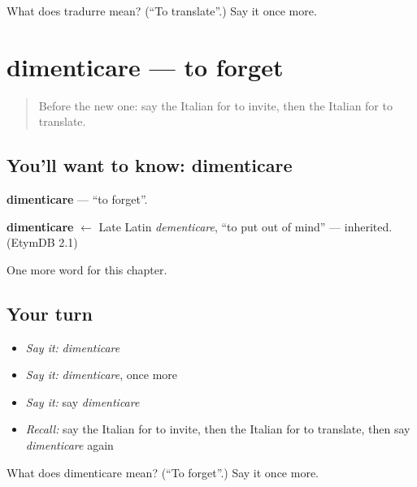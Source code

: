 \begin{tcolorbox}[breakable,colback=teal!4,colframe=teal!35!black,title={Before you move on}]
What does tradurre mean? (\textquotedblleft{}To translate\textquotedblright{}.) Say it once more.
\end{tcolorbox}
\section[dimenticare]{dimenticare — to forget}

\label{lesson:IT-C175-dimenticare}



\begin{quote}
Before the new one: say the Italian for to invite, then the Italian for to translate.
\end{quote}

\subsection*{You'll want to know: dimenticare}
\textbf{dimenticare} — \textquotedblleft{}to forget\textquotedblright{}.

\begin{cousinweb}
\textbf{dimenticare} $\leftarrow$ Late Latin \emph{dementicare}, \textquotedblleft{}to put out of mind\textquotedblright{} — inherited. (EtymDB 2.1)
\end{cousinweb}

\begin{grammarlens}[title={What you've built}]
One more word for this chapter.
\end{grammarlens}

\subsection*{Your turn}
\begin{itemize}
\raggedright
  \item \emph{Say it:} \emph{dimenticare}
  \item \emph{Say it:} \emph{dimenticare}, once more
  \item \emph{Say it:} say \emph{dimenticare}
  \item \emph{Recall:} say the Italian for to invite, then the Italian for to translate, then say \emph{dimenticare} again
\end{itemize}

\begin{tcolorbox}[breakable,colback=teal!4,colframe=teal!35!black,title={Before you move on}]
What does dimenticare mean? (\textquotedblleft{}To forget\textquotedblright{}.) Say it once more.
\end{tcolorbox}
